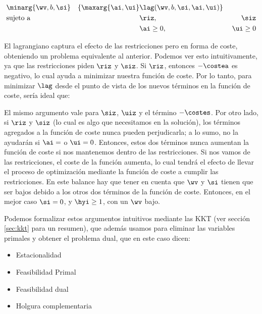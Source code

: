 \begin{equation*}
\begin{aligned}
&    \minarg{\wv,b,\si}
& \{  \maxarg{\ai,\ui}
&   \lag(\wv,b,\si,\ai,\ui) \} \\
& \text{sujeto a}
& &  \riz, &\; \siz \\ 
& & & \ai \geq 0, &\; \ui \geq 0 
\end{aligned}
\end{equation*}


El lagrangiano captura el efecto de las restricciones pero en forma de coste, obteniendo un problema equivalente al anterior. Podemos ver esto intuitivamente, ya que las restricciones piden $\riz$ y $\siz$. Si $\riz$, entonces $- \costea$ es negativo, lo cual ayuda a minimizar nuestra función de coste. Por lo tanto, para minimizar $\lag$  desde el punto de vista de los nuevos términos en la función de coste, sería ideal que:



El mismo argumento vale para $\siz$, $\uiz$ y el término $- \costes$. Por otro lado, si $\riz$ y $\siz$ (lo cual es algo que necesitamos en la solución), los términos agregados a la función de coste nunca pueden perjudicarla; a lo sumo, no la ayudarán si $\ai=$ o $\ui =0$. Entonces, estos dos términos nunca aumentan la función de coste si nos mantenemos dentro de las restricciones. Si nos vamos de las restricciones, el coste de la función aumenta, lo cual tendrá el efecto de llevar el proceso de optimización mediante la función de coste a cumplir las restricciones. En este balance hay que tener en cuenta que $\wv$ y $\si$ tienen que ser bajos debido a los otros dos términos de la función de coste. Entonces, en el mejor caso $\si = 0$, y $\hyi \geq 1$, con un $\wv$ bajo. 

Podemos formalizar estos argumentos intuitivos mediante las KKT (ver sección \ref{sec:kkt} para un resumen), que además usamos para eliminar las variables primales y obtener el problema dual, que en este caso dicen:


\begin{itemize}

\item Estacionalidad\\

\item Feasibilidad Primal	\\
\ma{
\riz & \quad \siz
}

\item Feasibilidad dual\\
\ma{
\aiz & \quad \uiz
}

\item Holgura complementaria\\

\end{itemize}

